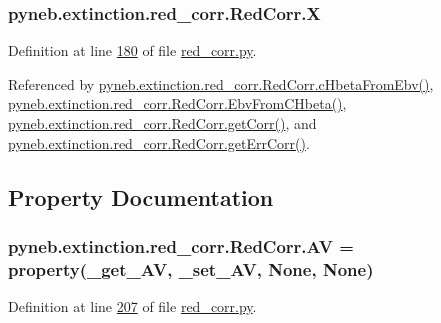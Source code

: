 \begin{DoxyVerb}
\subsubsection[{X}]{\setlength{\rightskip}{0pt plus 5cm}pyneb.\+extinction.\+red\+\_\+corr.\+Red\+Corr.\+X}\label{classpyneb_1_1extinction_1_1red__corr_1_1_red_corr_aac92bb80311cda78c01e61aa44655251}


Definition at line \hyperlink{red__corr_8py_source_l00180}{180} of file \hyperlink{red__corr_8py_source}{red\+\_\+corr.\+py}.



Referenced by \hyperlink{red__corr_8py_source_l00091}{pyneb.\+extinction.\+red\+\_\+corr.\+Red\+Corr.\+c\+Hbeta\+From\+Ebv()}, \hyperlink{red__corr_8py_source_l00107}{pyneb.\+extinction.\+red\+\_\+corr.\+Red\+Corr.\+Ebv\+From\+C\+Hbeta()}, \hyperlink{red__corr_8py_source_l00211}{pyneb.\+extinction.\+red\+\_\+corr.\+Red\+Corr.\+get\+Corr()}, and \hyperlink{red__corr_8py_source_l00251}{pyneb.\+extinction.\+red\+\_\+corr.\+Red\+Corr.\+get\+Err\+Corr()}.



\subsection{Property Documentation}
\hypertarget{classpyneb_1_1extinction_1_1red__corr_1_1_red_corr_acbf4ca9cf48abed38b1ffad057420c71}{}
\subsubsection[{A\+V}]{\setlength{\rightskip}{0pt plus 5cm}pyneb.\+extinction.\+red\+\_\+corr.\+Red\+Corr.\+A\+V = property({\bf \+\_\+get\+\_\+\+A\+V}, {\bf \+\_\+set\+\_\+\+A\+V}, None, None)\hspace{0.3cm}{\ttfamily [static]}}\label{classpyneb_1_1extinction_1_1red__corr_1_1_red_corr_acbf4ca9cf48abed38b1ffad057420c71}


Definition at line \hyperlink{red__corr_8py_source_l00207}{207} of file \hyperlink{red__corr_8py_source}{red\+\_\+corr.\+py}.

\hypertarget{classpyneb_1_1extinction_1_1red__corr_1_1_red_corr_aaf16ae2a0bdb5dd620f9db382ffeebc9}{}

\end{DoxyVerb}

